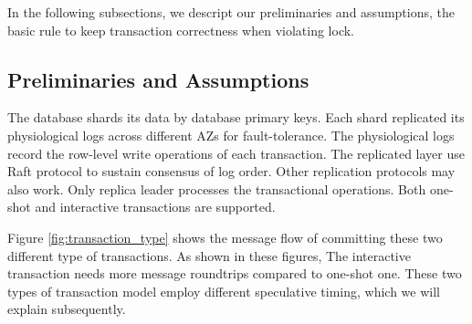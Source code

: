 \documentclass[conference]{IEEEtran}
\begin{document}
In the following subsections, we descript our preliminaries and assumptions, the basic rule to keep transaction correctness when violating lock.

\subsection{Preliminaries and Assumptions}
The database shards its data by database primary keys.
Each shard replicated its physiological logs across different AZs for fault-tolerance.
The physiological logs record the row-level write operations of each transaction.
The replicated layer use Raft protocol to sustain consensus of log order. Other replication protocols may also work.
Only replica leader processes the transactional operations.
Both one-shot and interactive transactions are supported.

Figure \ref{fig:transaction_type} shows the message flow of committing these two different type of transactions.
As shown in these figures, The interactive transaction needs more message roundtrips compared to one-shot one.
These two types of transaction model employ different speculative timing, which we will explain subsequently.
\end{document}
